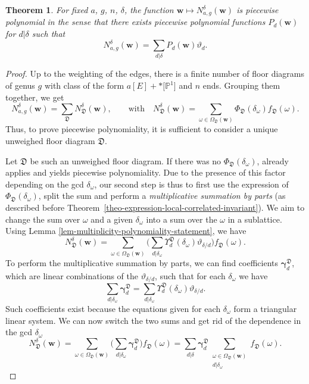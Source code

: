 \documentclass[pdftex]{sigma}
\newcommand{\PP}{\mathbb{P}}
\newcommand{\bfw}{ {\boldsymbol w} }
\newcommand{\Dfk}{\mathfrak{D}}
\numberwithin{equation}{section}
\newtheorem{theo}{Theorem}[section]
\theoremstyle{definition}
\begin{document}
\begin{theo}\label{theo-quasi-polynomiality}
For fixed $a$, $g$, $n$, $\delta$, the function $\bfw\mapsto N^\delta_{a,g}(\bfw)$ is piecewise polynomial in the sense that there exists piecewise polynomial functions $P_d(\bfw)$ for $d|\delta$ such that
\[ N^\delta_{a,g}(\bfw) = \sum_{d|\delta}P_d(\bfw)\vartheta_d. \]
\end{theo}

\begin{proof}
Up to the weighting of the edges, there is a finite number of floor diagrams of genus $g$ with class of the form $a[E]+\ast \big[\PP^1\big]$ and $n$ ends. Grouping them together, we get
\[ N^\delta_{a,g}(\bfw) = \sum_\Dfk N^\delta_\Dfk(\bfw),\qquad \text{with}\quad N^\delta_\Dfk(\bfw) = \sum_{\omega\in\Omega_\Dfk(\bfw)} \Phi_\Dfk(\delta_\omega) f_\Dfk(\omega). \]
Thus, to prove piecewise polynomiality, it is sufficient to consider a unique unweighed floor diagram $\Dfk$.

Let $\Dfk$ be such an unweighed floor diagram. If there was no $\Phi_\Dfk(\delta_\omega)$, \cite[Theorem 4.2]{ardila2017double} already applies and yields piecewise polynomiality. Due to the presence of this factor depending on the gcd $\delta_\omega$, our second step is thus to first use the expression of $\Phi_\Dfk(\delta_\omega)$, split the sum and perform a \textit{multiplicative summation by parts} (as described before Theorem~\ref{theo-expression-local-correlated-invariant}). We aim to change the sum over $\omega$ and a given $\delta_\omega$ into a sum over the $\omega$ in a sublattice. Using Lemma \ref{lem-multiplicity-polynomiality-statement}, we have
\[ N^\delta_\Dfk(\bfw) = \sum_{\omega\in\Omega_\Dfk(\bfw)} \biggl(\sum_{d|\delta_\omega}\Upsilon^\Dfk_d(\delta_\omega)\vartheta_{\delta/d}\biggr) f_\Dfk(\omega). \]
To perform the multiplicative summation by parts, we can find coefficients $\boldsymbol{\gamma}^\Dfk_d$, which are linear combinations of the $\vartheta_{\delta/d}$, such that for each $\delta_\omega$ we have
\[ \sum_{d|\delta_\omega}\boldsymbol{\gamma}^\Dfk_d =
\sum_{d|\delta_\omega}\Upsilon^\Dfk_d(\delta_\omega)\vartheta_{\delta/d}. \]
Such coefficients exist because the equations given for each $\delta_\omega$ form a triangular linear system. We can now switch the two sums and get rid of the dependence in the gcd $\delta_\omega$
\[ N^\delta_\Dfk(\bfw) =
\sum_{\omega\in\Omega_\Dfk(\bfw)} \biggl(\sum_{d|\delta_\omega}\boldsymbol{\gamma}^\Dfk_d\biggr) f_\Dfk(\omega)
=\sum_{d|\delta} \boldsymbol{\gamma}^\Dfk_d \sum_{\substack{\omega\in\Omega_\Dfk(\bfw) \\ d|\delta_\omega}} f_\Dfk(\omega). \]


\end{proof}
\end{document}
